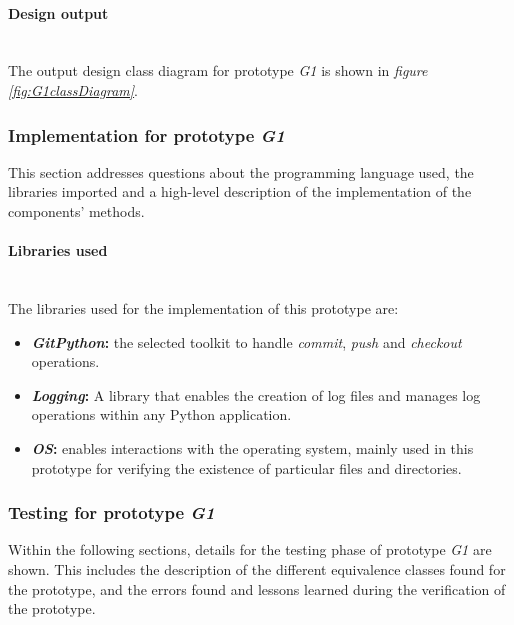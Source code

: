 \paragraph{Design output}\mbox{}\\

The output design class diagram for prototype \emph{G1} is shown in \emph{figure \ref{fig:G1classDiagram}}.

\subsubsection{Implementation for prototype \emph{G1}}

This section addresses questions about the programming language used, the libraries imported and a high-level description of the implementation of the components' methods.

\paragraph{Libraries used} \mbox{}\\

The libraries used for the implementation of this prototype are:

\begin{itemize}

    \item \textbf{\emph{GitPython}: }the selected toolkit to handle \emph{commit}, \emph{push} and \emph{checkout} operations.
    \item \textbf{\emph{Logging}: }A library that enables the creation of log files and manages log operations within any Python application.
    \item \textbf{\emph{OS}: }enables interactions with the operating system, mainly used in this prototype for verifying the existence of particular files and directories.

\end{itemize}

\subsubsection{Testing for prototype \emph{G1}}

Within the following sections, details for the testing phase of prototype \emph{G1} are shown. This includes the description of the different equivalence classes found for the prototype, and the
errors found and lessons learned during the verification of the prototype.

